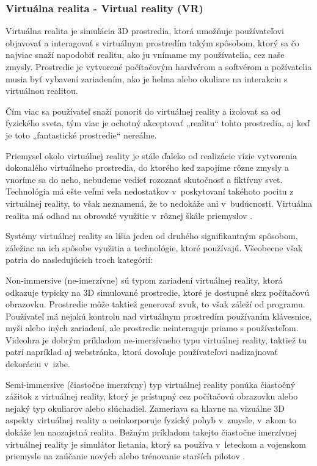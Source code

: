 \subsubsection{Virtuálna realita - Virtual reality (VR)}

Virtuálna realita je simulácia 3D prostredia, ktorá umožňuje používateľovi objavovať a interagovať s virtuálnym prostredím takým spôsobom, ktorý sa čo najviac snaží napodobiť realitu, ako ju vnímame my používatelia, cez naše zmysly. Prostredie je vytvorené počítačovým hardvérom a softvérom a požívatelia musia byť vybavení zariadením, ako je helma alebo okuliare na interakciu s virtuálnou realitou. 

Čím viac sa používateľ snaží ponoriť do virtuálnej reality a izolovať sa od fyzického sveta, tým viac je ochotný akceptovať „realitu“ tohto prostredia, aj keď je toto „fantastické prostredie“ nereálne.

Priemysel okolo virtuálnej reality je stále ďaleko od realizácie vízie vytvorenia dokonalého virtuálneho prostredia, do ktorého keď zapojíme rôzne zmysly a  vnoríme sa do neho, nebudeme vedieť rozoznať skutočnosť a fiktívny svet. Technológia má ešte veľmi veľa nedostatkov v~poskytovaní takéhoto pocitu z virtuálnej reality, to však neznamená, že to nedokáže ani v~budúcnosti. Virtuálna realita má odhad na obrovské využitie v~rôznej škále priemyslov \cite{sheldon2022vr}. 

Systémy virtuálnej reality sa líšia jeden od druhého signifikantným spôsobom, záležiac na ich spôsobe využitia a technológie, ktoré používajú. Všeobecne však patria do nasledujúcich troch kategórií: 

Non-immersive (ne-imerzívne) sú typom zariadení virtuálnej reality, ktorá odkazuje typicky na 3D simulované prostredie, ktoré je dostupné skrz počítačovú obrazovku. Prostredie môže taktiež generovať zvuk, to však záleží od programu. Používateľ má nejakú kontrolu nad virtuálnym prostredím používaním klávesnice, myši alebo iných zariadení, ale prostredie neinteraguje priamo s používateľom. Videohra je dobrým príkladom ne-imerzívneho typu virtuálnej reality, taktiež tu patrí napríklad aj webstránka, ktorá dovoľuje používateľovi nadizajnovať dekoráciu v~izbe. 

Semi-immersive (čiastočne imerzívny) typ virtuálnej reality ponúka čiastočný zážitok z virtuálnej reality, ktorý je prístupný cez počítačovú obrazovku alebo nejaký typ okuliarov alebo slúchadiel. Zameriava sa hlavne na vizuálne 3D aspekty virtuálnej reality a neinkorporuje fyzický pohyb v~zmysle, v~akom to dokáže len naozajstná realita. Bežným príkladom takejto čiastočne imerzívnej virtuálnej reality je simulátor lietania, ktorý sa používa v~leteckom a vojenskom priemysle na zaúčanie nových alebo trénovanie starších pilotov \cite{sheldon2022vr}. 

